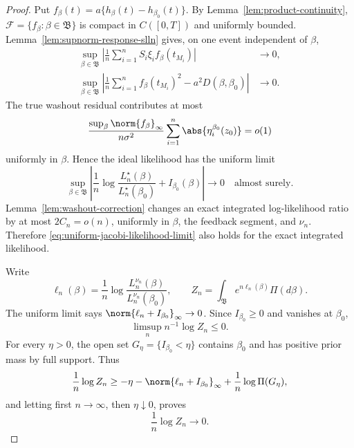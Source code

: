 \begin{proof}
Put \(f_\beta(t)=a\{h_\beta(t)-h_{\beta_0}(t)\}\).  By
Lemma~\ref{lem:product-continuity},
\(\mathcal F=\{f_\beta:\beta\in\mathfrak B\}\) is compact in
\(C([0,T])\) and uniformly bounded.  Lemma~\ref{lem:supnorm-response-slln}
gives, on one event independent of \(\beta\),
\begin{align}
 \sup_{\beta\in\mathfrak B}
 \left|\frac1n\sum_{i=1}^nS_i\xi_i f_\beta(t_{M_i})\right|&\longrightarrow0,
 \label{eq:uniform-score-slln}\\
 \sup_{\beta\in\mathfrak B}
 \left|\frac1n\sum_{i=1}^nf_\beta(t_{M_i})^2
      -a^2D(\beta,\beta_0)\right|&\longrightarrow0.
 \label{eq:uniform-square-slln}
\end{align}
The true washout residual contributes at most
\[
 \frac{\sup_{\beta}\norm{f_\beta}_\infty}{n\sigma^2}
 \sum_{i=1}^n\abs{\eta_i^{\beta_0}(z_0)}=o(1)
\]
uniformly in \(\beta\).  Hence the ideal likelihood has the uniform limit
\begin{equation}
 \sup_{\beta\in\mathfrak B}
 \left|\frac1n\log\frac{L_n^\star(\beta)}{L_n^\star(\beta_0)}
       +I_{\beta_0}(\beta)\right|\longrightarrow0
 \quad\text{almost surely}.
 \label{eq:uniform-jacobi-likelihood-limit}
\end{equation}
Lemma~\ref{lem:washout-correction} changes an exact integrated log-likelihood
ratio by at most \(2C_n=o(n)\), uniformly in \(\beta\), the feedback segment,
and \(\nu_n\).  Therefore \eqref{eq:uniform-jacobi-likelihood-limit} also
holds for the exact integrated likelihood.

Write
\[
 \ell_n(\beta)=\frac1n\log
 \frac{L_n^{\nu_n}(\beta)}{L_n^{\nu_n}(\beta_0)},
 \qquad Z_n=\int_{\mathfrak B}e^{n\ell_n(\beta)}\Pi(d\beta).
\]
The uniform limit says \(\norm{\ell_n+I_{\beta_0}}_\infty\to0\).  Since
\(I_{\beta_0}\ge0\) and vanishes at \(\beta_0\),
\[
 \limsup_n n^{-1}\log Z_n\le0.
\]
For every \(\eta>0\), the open set
\(G_\eta=\{I_{\beta_0}<\eta\}\) contains \(\beta_0\) and has positive prior
mass by full support.  Thus
\[
 \frac1n\log Z_n\ge-\eta-
 \norm{\ell_n+I_{\beta_0}}_\infty+\frac1n\log\Pi(G_\eta),
\]
and letting first \(n\to\infty\), then \(\eta\downarrow0\), proves
\begin{equation}
 \frac1n\log Z_n\longrightarrow0.
 \label{eq:jacobi-denominator-rate}
\end{equation}


\end{proof}
